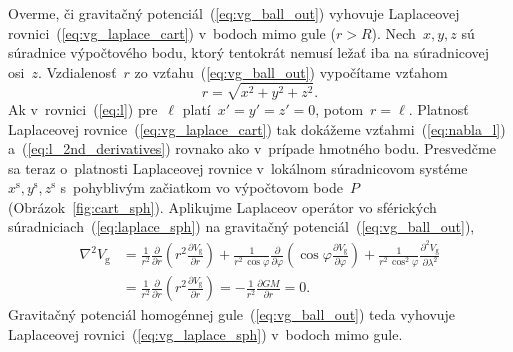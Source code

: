 \documentclass[a4paper, 12pt]{book}
\newcommand{\gidx}{\mathrm g}
\begin{document}
Overme, či gravitačný potenciál~(\ref{eq:vg_ball_out}) vyhovuje Laplaceovej 
rovnici~(\ref{eq:vg_laplace_cart}) v~bodoch mimo gule ($r > R$).  Nech~$x, y, 
z$ sú súradnice výpočtového bodu, ktorý tentokrát nemusí ležať iba na 
súradnicovej osi~$z$.  Vzdialenosť~$r$ zo vzťahu~(\ref{eq:vg_ball_out}) 
vypočítame vzťahom
%
\begin{equation}
\label{eq:spherical_radius}
r = \sqrt{x^2 + y^2 + z^2}.
\end{equation}
%
Ak v~rovnici~(\ref{eq:l}) pre~$\ell$ platí~$x' = y' = z' = 0$, potom~$r 
= \ell$.  Platnosť Laplaceovej rovnice~(\ref{eq:vg_laplace_cart}) tak dokážeme 
vzťahmi~(\ref{eq:nabla_l}) a~(\ref{eq:l_2nd_derivatives}) rovnako ako v~prípade 
hmotného bodu.  Presvedčme sa teraz o~platnosti Laplaceovej rovnice v~lokálnom 
súradnicovom systéme~$x^\mathrm{s}, y^\mathrm{s}, z^\mathrm{s}$ s~pohyblivým 
začiatkom vo výpočtovom bode~$P$ (Obrázok~\ref{fig:cart_sph}).  Aplikujme 
Laplaceov operátor vo sférických súradniciach~(\ref{eq:laplace_sph}) na 
gravitačný potenciál~(\ref{eq:vg_ball_out}),
%
\begin{equation}
\begin{split}
\nabla^2 V_\gidx &= \frac{1}{r^2} \frac{\partial}{\partial r} \left( r^2 
\frac{\partial V_\gidx}{\partial r} \right) + \frac{1}{r^2 \, \cos\varphi} 
\frac{\partial}{\partial \varphi} \left( \cos\varphi \frac{\partial 
V_\gidx}{\partial \varphi} \right) + \frac{1}{r^2 \, 
\cos^2\varphi}\frac{\partial^2 V_\gidx}{\partial \lambda^2}\\
%
&= \frac{1}{r^2} \frac{\partial}{\partial r} \left( r^2 \frac{\partial 
V_\gidx}{\partial r} \right) = -\frac{1}{r^2} \frac{\partial GM}{\partial r} 
= 0{.}
\end{split}
\end{equation}
%
Gravitačný potenciál homogénnej gule~(\ref{eq:vg_ball_out}) teda vyhovuje 
Laplaceovej rovnici~(\ref{eq:vg_laplace_sph}) v~bodoch mimo gule.
\end{document}
